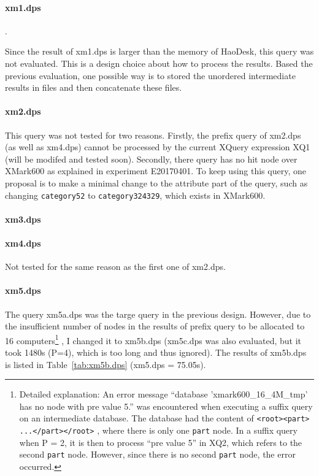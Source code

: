 \paragraph{xm1.dps}.

Since the result of xm1.dps is larger than the memory of HaoDesk, this query was
not evaluated. This is a design  choice about how to process the results. Based
the previous evaluation, one possible way is to stored the unordered
intermediate results in files and then concatenate these files.

\paragraph{xm2.dps}

This query was not tested for two reasons. Firstly, the prefix query of xm2.dps
(as well as xm4.dps) cannot be processed by the current XQuery expression XQ1
(will be modifed and tested soon). Secondly, there query has no hit node over
XMark600 as explained in experiment E20170401. To keep using this query, one
proposal is to make a minimal change to the attribute part of the query, such as
changing \texttt{category52} to \texttt{category324329}, which exists in
XMark600.


\paragraph{xm3.dps}





\paragraph{xm4.dps}

Not tested for the same reason as the first one of xm2.dps.

\paragraph{xm5.dps}

The query xm5a.dps was the targe query in the previous design. 
However, due to the insufficient number of nodes in the results of prefix 
query to be allocated to 16 
computers\footnote{
Detailed explanation: An error message 
``database 'xmark600\_16\_4M\_tmp' has no node with pre value 5.'' was
encountered when executing a suffix query on an intermediate database.
The database had the content of  \texttt{<root><part> ...</part></root>} , 
where there is only one \texttt{part} node. 
In a suffix query when P = 2, it is then to process ``pre value 5'' in XQ2, 
which refers to the second \texttt{part} node. However, since there is 
no second \texttt{part} node, the error occurred.
}
, I changed it to xm5b.dps (xm5c.dps was also evaluated, but 
it took 1480s (P=4), which is too long and thus ignored). 
The results of xm5b.dps is listed in Table~\ref{tab:xm5b.dps}
(xm5.dps = 75.05s). 


